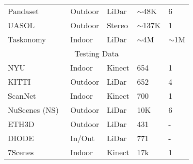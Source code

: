 \documentclass[10pt,onecolumn,letterpaper]{article}
\begin{document}
\begin{table}[]
\begin{threeparttable}
{\begin{tabular}{ r llll}
\multicolumn{1}{l|}{Pandaset~\cite{itsc21pandaset}}                       & \multicolumn{1}{l|}{Outdoor}        & \multicolumn{1}{l|}{LiDar}                 & \multicolumn{1}{l|}{$\sim$48K}         & 6              \\
\multicolumn{1}{l|}{UASOL~\cite{bauer2019uasol}}                          & \multicolumn{1}{l|}{Outdoor}        & \multicolumn{1}{l|}{Stereo\tnote{\dag}}       & \multicolumn{1}{l|}{$\sim$137K}        & 1              \\
\multicolumn{1}{l|}{Taskonomy~\cite{zamir2018taskonomy}}                      & \multicolumn{1}{l|}{Indoor}         & \multicolumn{1}{l|}{LiDar}                 & \multicolumn{1}{l|}{$\sim$4M}       & $\sim$1M            \\ \hline
\multicolumn{5}{c}{Testing Data}                                                                                                                                                           \\ \hline
\multicolumn{1}{l|}{NYU~\cite{silberman2012indoor}}                            & \multicolumn{1}{l|}{Indoor}         & \multicolumn{1}{l|}{Kinect}                & \multicolumn{1}{l|}{654}         & 1              \\
\multicolumn{1}{l|}{KITTI~\cite{Geiger2013IJRR}}                          & \multicolumn{1}{l|}{Outdoor}        & \multicolumn{1}{l|}{LiDar}                 & \multicolumn{1}{l|}{652}           & 4         \\
\multicolumn{1}{l|}{ScanNet~\cite{dai2017scannet}}                        & \multicolumn{1}{l|}{Indoor}         & \multicolumn{1}{l|}{Kinect}                & \multicolumn{1}{l|}{700}         & 1              \\
\multicolumn{1}{l|}{NuScenes (NS)~\cite{caesar2020nuscenes}}                       & \multicolumn{1}{l|}{Outdoor}        & \multicolumn{1}{l|}{LiDar}                 & \multicolumn{1}{l|}{10K}           & 6              \\
\multicolumn{1}{l|}{ETH3D~\cite{schops2017multi}}                          & \multicolumn{1}{l|}{Outdoor}        & \multicolumn{1}{l|}{LiDar}                 & \multicolumn{1}{l|}{431}           & -\tnote{$\ast$}              \\
\multicolumn{1}{l|}{DIODE~\cite{vasiljevic2019diode}}                          & \multicolumn{1}{l|}{In/Out} & \multicolumn{1}{l|}{LiDar}                 & \multicolumn{1}{l|}{771}           & -\tnote{$\ast$}           \\
\multicolumn{1}{l|}{7Scenes~\cite{shotton2013scene}}                        & \multicolumn{1}{l|}{Indoor}         & \multicolumn{1}{l|}{Kinect}                & \multicolumn{1}{l|}{17k}           & 1              \\\toprule[1pt]

\end{tabular}}
\end{threeparttable}
\end{table}
\end{document}
